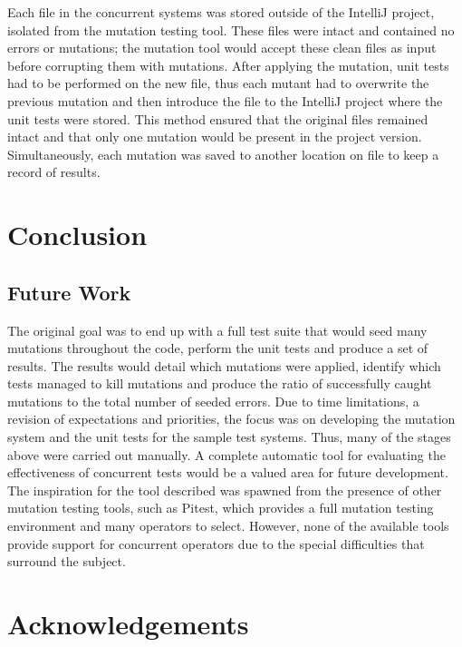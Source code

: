 \documentclass[a4paper,12pt]{article}
\begin{document}
Each file in the concurrent systems was stored outside of the IntelliJ project, isolated from the mutation testing tool. These files were intact and contained no errors or mutations; the mutation tool would accept these clean files as input before corrupting them with mutations. After applying the mutation, unit tests had to be performed on the new file, thus each mutant had to overwrite the previous mutation and then introduce the file to the IntelliJ project where the unit tests were stored. This method ensured that the original files remained intact and that only one mutation would be present in the project version. Simultaneously, each mutation was saved to another location on file to keep a record of results. 

    
    
\newpage	
\section{Conclusion}

\subsection{Future Work}
The original goal was to end up with a full test suite that would seed many mutations throughout the code, perform the unit tests and produce a set of results. The results would detail which mutations were applied, identify which tests managed to kill mutations and produce the ratio of successfully caught mutations to the total number of seeded errors. Due to time limitations, a revision of expectations and priorities, the focus was on developing the mutation system and the unit tests for the sample test systems. Thus, many of the stages above were carried out manually. A complete automatic tool for evaluating the effectiveness of concurrent tests would be a valued area for future development. The inspiration for the tool described was spawned from the presence of other mutation testing tools, such as Pitest, which provides a full mutation testing environment and many operators to select. However, none of the available tools provide support for concurrent operators due to the special difficulties that surround the subject.
    
\newpage
\section{Acknowledgements}


\end{document}
